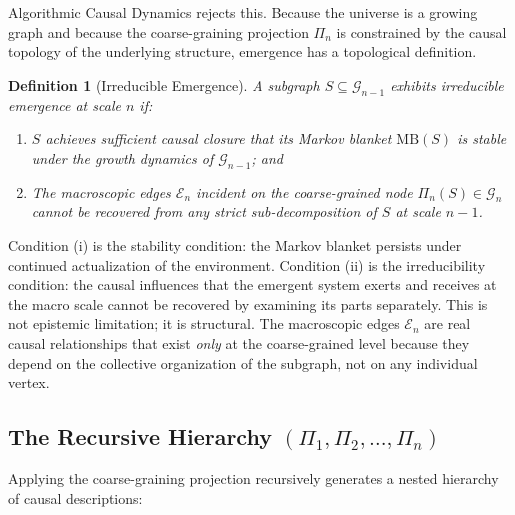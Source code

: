\documentclass[11pt,a4paper]{article}
\newtheorem{definition}[theorem]{Definition}
\theoremstyle{remark}
\newcommand{\MB}{\mathrm{MB}}
\newcommand{\GG}{\mathcal{G}}
\newcommand{\EE}{\mathcal{E}}
\begin{document}
Algorithmic Causal Dynamics rejects this. Because the universe is a growing graph
and because the coarse-graining projection $\Pi_n$ is constrained by the causal
topology of the underlying structure, emergence has a topological definition.

\begin{definition}[Irreducible Emergence]
A subgraph $S \subseteq \GG_{n-1}$ exhibits \emph{irreducible emergence} at
scale $n$ if:
\begin{enumerate}[noitemsep,label=(\roman*)]
  \item $S$ achieves sufficient causal closure that its Markov blanket
    $\MB(S)$ is stable under the growth dynamics of $\GG_{n-1}$; and
  \item The macroscopic edges $\EE_n$ incident on the coarse-grained node
    $\Pi_n(S) \in \GG_n$ cannot be recovered from any strict sub-decomposition
    of $S$ at scale $n-1$.
\end{enumerate}
\end{definition}

Condition (i) is the stability condition: the Markov blanket persists under
continued actualization of the environment. Condition (ii) is the irreducibility
condition: the causal influences that the emergent system exerts and receives at
the macro scale cannot be recovered by examining its parts separately. This is
not epistemic limitation; it is structural. The macroscopic edges $\EE_n$ are
real causal relationships that exist \emph{only} at the coarse-grained level
because they depend on the collective organization of the subgraph, not on any
individual vertex.

\subsection{The Recursive Hierarchy $(\Pi_1, \Pi_2, \ldots, \Pi_n)$}

Applying the coarse-graining projection recursively generates a nested hierarchy
of causal descriptions:
\end{document}
